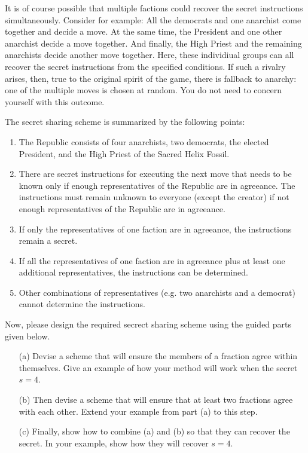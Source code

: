 \documentclass[]{article}
\begin{document}
\begin{qunlist}
It is of course possible that multiple factions could recover the secret instructions simultaneously.
Consider for example: All the democrats and one anarchist come together and decide a move. 
At the same time, the President and one other anarchist decide a move together. 
And finally, the High Priest and the remaining anarchists decide another move together. 
Here, these individiual groups can all recover the secret instructions from the specified conditions.
If such a rivalry arises, then, true to the original spirit of the game, there is fallback to anarchy: one of the multiple moves is chosen at random.
You do not need to concern yourself with this outcome.

The secret sharing scheme is summarized by the following points:

\begin{enumerate}
\item  The Republic consists of four anarchists, two democrats, the elected President, and the High Priest of the Sacred Helix Fossil.
\item  There are secret instructions for executing the next move that needs to be known only if enough representatives of the Republic are in agreeance. The instructions must remain unknown to everyone (except the creator) if not enough representatives of the Republic are in agreeance.
\item  If only the representatives of one faction are in agreeance, the instructions remain a secret.
\item  If all the representatives of one faction are in agreeance plus at least one additional representatives, the instructions can be determined.
\item  Other combinations of representatives (e.g. two anarchists and a democrat) cannot determine the instructions.
\end{enumerate}


Now, please design the required secrect sharing scheme using the guided parts given below.

\begin{enumerate}
\qpart
\item[(a)] Devise a scheme that will ensure the members of a fraction agree within themselves.  Give an example of how your method will work when the secret $s=4$.
\qpart
\item[(b)] Then devise a scheme that will ensure that at least two fractions agree with each other. Extend your example from part (a) to this step.
\qpart
\item[(c)] Finally, show how to combine (a) and (b) so that they can recover the secret. In your example, show how they will recover $s=4$.
\end{enumerate}





\end{qunlist}
\end{document}
